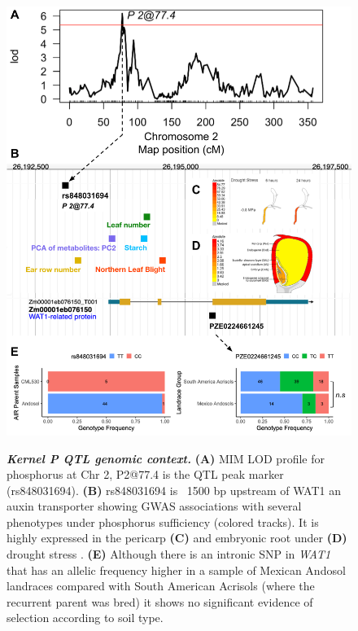 \begin{figure}[b]
\includegraphics[width=\linewidth]{Chapter-4/figs/WAT1.png}
\caption[]{}
\label{fig::WAT1}
\end{figure}

\clearpage

\addtocounter{figure}{-1}
\begin{figure} [t!]
  \caption[Kernel Phosphorus QTL genomic context]{\textit{\textbf{Kernel P QTL genomic context.}} \textbf{(A)} MIM LOD profile for phosphorus at Chr 2, P2@77.4 is the QTL peak marker (rs848031694).
  \textbf{(B)} rs848031694 is ~1500 bp upstream of WAT1 an auxin transporter showing GWAS associations with several phenotypes under phosphorus sufficiency (colored tracks). It is highly expressed in the pericarp \textbf{(C)} and embryonic root under \textbf{(D)} drought stress .
  \textbf{(E)} Although there is an intronic SNP in \textit{WAT1} that has an allelic frequency higher in a sample of Mexican Andosol landraces compared with  South American Acrisols (where the recurrent parent was bred) it shows no significant evidence of selection according to soil type.}
\end{figure}

